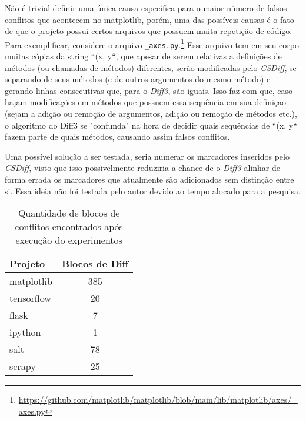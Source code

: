 Não é trivial definir uma única causa específica para o maior número de falsos
conflitos que acontecem no matplotlib, porém, uma das possíveis causas é o fato
de que o projeto possui certos arquivos que possuem muita repetição de código.
Para exemplificar, considere o arquivo
\verb|_axes.py|.\footnote{\url{https://github.com/matplotlib/matplotlib/blob/main/lib/matplotlib/axes/_axes.py}}
Esse arquivo tem em seu corpo muitas cópias da string ``(x, y``, que apesar de
serem relativas a definições de métodos (ou chamadas de métodos) diferentes,
serão modificadas pelo \emph{CSDiff}, se separando de seus métodos (e de outros
argumentos do mesmo método) e gerando linhas consecutivas que, para o
\emph{Diff3}, são iguais. Isso faz com que, caso hajam modificações em métodos
que possuem essa sequência em sua definiçao (sejam a adição ou remoção de
argumentos, adição ou remoção de métodos etc.), o algoritmo do Diff3 se
"confunda" na hora de decidir quais sequências de ``(x, y`` fazem parte de
quais métodos, causando assim falsos conflitos.

Uma possível solução a ser testada, seria numerar os marcadores inseridos pelo
\emph{CSDiff}, visto que isso possivelmente reduziria a chance de o
\emph{Diff3} alinhar de forma errada os marcadores que atualmente são
adicionados sem distinção entre si. Essa ideia não foi testada pelo autor
devido ao tempo alocado para a pesquisa.

\begin{table}[ht]
	\begin{center}
		\begin{tabular}{|l|c|}
			\hline
			\textbf{Projeto} & \textbf{Blocos de Diff} \\
			\hline
			matplotlib       & 385                     \\
			tensorflow       & 20                      \\
			flask            & 7                       \\
			ipython          & 1                       \\
			salt             & 78                      \\
			scrapy           & 25                      \\
			\hline
		\end{tabular}
	\end{center}
	\caption{Quantidade de blocos de conflitos encontrados após execução do
		experimentos}\label{block_diff}
\end{table}

